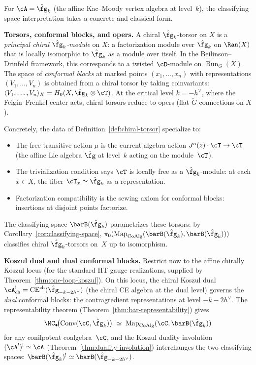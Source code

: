 \begin{example}
\label{ex:affine-classifying-space}
For $\cA = \hat{\fg}_k$ (the affine Kac--Moody vertex algebra at
level~$k$), the classifying space interpretation takes a
concrete and classical form.

\medskip\noindent
\textbf{Torsors, conformal blocks, and opers.}
A chiral $\hat{\fg}_k$-torsor on $X$ is a \emph{principal chiral
$\hat{\fg}_k$-module} on $X$: a factorization module over
$\hat{\fg}_k$ on $\Ran(X)$ that is locally isomorphic to
$\hat{\fg}_k$ as a module over itself. In the
Beilinson--Drinfeld framework, this corresponds to a twisted
$\cD$-module on $\operatorname{Bun}_G(X)$. The space of \emph{conformal
blocks} at marked points $(x_1,\ldots,x_n)$ with representations
$(V_1,\ldots,V_n)$ is obtained from a chiral torsor by taking
coinvariants:
$\langle V_1,\ldots,V_n \rangle_X = H_0(X, \hat{\fg}_k \otimes
\cT)$. At the critical level $k = -h^\vee$, where the
Feigin--Frenkel center acts, chiral torsors reduce to opers
(flat $\check{G}$-connections on $X$).

Concretely, the data of
Definition~\ref{def:chiral-torsor} specialize to:
\begin{itemize}
\item The free transitive action $\mu$ is the current algebra
 action $J^a(z) \cdot \cT \to \cT$ (the affine Lie algebra
 $\hat{\fg}$ at level~$k$ acting on the module~$\cT$).
\item The trivialization condition says $\cT$ is locally free as a
 $\hat{\fg}_k$-module: at each $x \in X$, the fiber
 $\cT_x \simeq \hat{\fg}_k$ as a representation.
\item Factorization compatibility is the sewing axiom for
 conformal blocks: insertions at disjoint points factorize.
\end{itemize}
The classifying space $\barB(\hat{\fg}_k)$ parametrizes these
torsors: by Corollary~\ref{cor:classifying-space},
$\pi_0(\mathrm{Map}_{\mathrm{CoAlg}}(\barB(\hat{\fg}_k),
\barB(\hat{\fg}_k)))$ classifies chiral $\hat{\fg}_k$-torsors
on~$X$ up to isomorphism.

\medskip\noindent
\textbf{Koszul dual and dual conformal blocks.}
Restrict now to the affine chirally Koszul locus
\textup{(}for the standard HT gauge realizations, supplied by
Theorem~\textup{\ref{thm:one-loop-koszul}}\textup{)}. On this
locus, the chiral Koszul dual
$\cA^!_{\mathrm{ch}} = \mathrm{CE}^{\mathrm{ch}}(\hat{\fg}_{-k-2h^\vee})$ (the chiral CE algebra at the
dual level) governs the
\emph{dual} conformal blocks: the contragredient representations
at level $-k - 2h^\vee$. The representability theorem
(Theorem~\ref{thm:bar-representability}) gives
\[
\MC_\bullet\!\bigl(\mathrm{Conv}(\cC, \hat{\fg}_k)\bigr)
\;\simeq\;
\mathrm{Map}_{\mathrm{CoAlg}}(\cC, \barB(\hat{\fg}_k))
\]
for any conilpotent coalgebra~$\cC$, and the Koszul duality
involution $(\cA^!)^! \simeq \cA$
(Theorem~\ref{thm:duality-involution}) interchanges
the two classifying spaces:
$\barB(\hat{\fg}_k)^! \simeq \barB(\hat{\fg}_{-k-2h^\vee})$.


\end{example}
